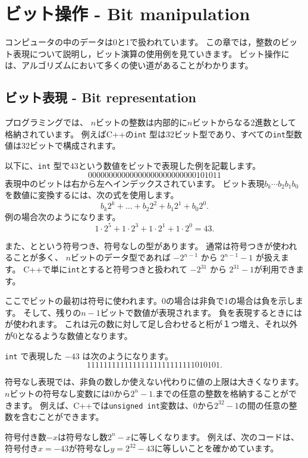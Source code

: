 \chapter{ビット操作 - Bit manipulation}

コンピュータの中のデータは0と1で扱われています。
この章では，整数のビット表現について説明し，ビット演算の使用例を見ていきます。
ビット操作には、アルゴリズムにおいて多くの使い道があることがわかります。

\section{ビット表現 - Bit representation}


プログラミングでは、
$n$ビットの整数は内部的に$n$ビットからなる2進数として格納されています。
例えばC++の\texttt{int} 型は32ビット型であり、すべての\texttt{int}型数値は32ビットで構成されます。

以下に、\texttt{int} 型で43という数値をビットで表現した例を記載します。
\[00000000000000000000000000101011\]
表現中のビットは右から左へインデックスされています。
ビット表現$b_k \cdots b_2 b_1 b_0$  を数値に変換するには、次の式を使用します。
\[b_k 2^k + \ldots + b_2 2^2 + b_1 2^1 + b_0 2^0.\]
例の場合次のようになります。
\[1 \cdot 2^5 + 1 \cdot 2^3 + 1 \cdot 2^1 + 1 \cdot 2^0 = 43.\]

また、とという符号つき、符号なしの型があります。
通常は符号つきが使われることが多く、
$n$ビットのデータ型であれば
$-2^{n-1}$ から $2^{n-1}-1$
が扱えます。
C++で単に\texttt{int}とすると符号つきと扱われて
$-2^{31}$ から $2^{31}-1$が利用できます。

ここでビットの最初は符号に使われます。0の場合は非負で1の場合は負を示します。
そして、残りの$n-1$ビットで数値が表現されます。
負を表現するときにはが使われます。
これは元の数に対して足し合わせると桁が１つ増え、それ以外が0となるような数値となります。

\texttt{int} で表現した $-43$ は次のようになります。
\[11111111111111111111111111010101.\]


符号なし表現では、非負の数しか使えない代わりに値の上限は大きくなります。
$n$ビットの符号なし変数には$0$から$2^n-1$.までの任意の整数を格納することができます。
例えば、C++では\texttt{unsigned int}変数は、$0$から$2^{32}-1$の間の任意の整数を含むことができます。

符号付き数$-x$は符号なし数$2^n-x$に等しくなります。
例えば、次のコードは、符号付き$x = -43$が符号なし$y=2^{32}-43$に等しいことを確かめています。

